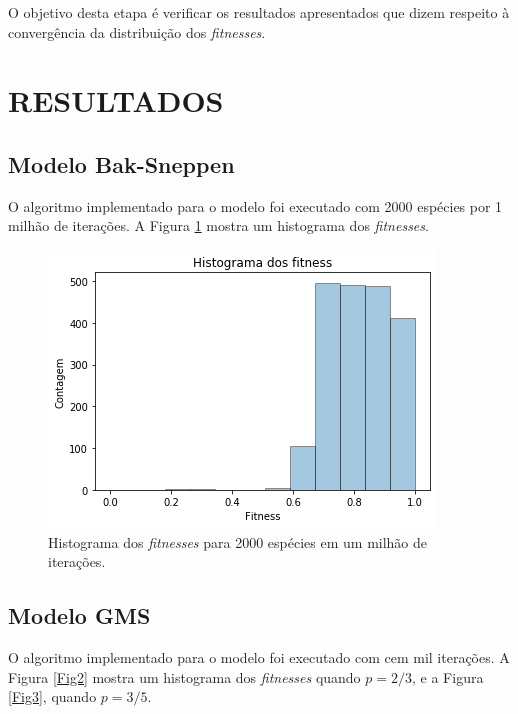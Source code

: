 \documentclass[10pt,brazil,english]{article}
\begin{document}
        O objetivo desta etapa é verificar os resultados apresentados que dizem respeito à convergência da distribuição dos \textit{fitnesses}.

    \section{RESULTADOS}

        \subsection{Modelo Bak-Sneppen}

            O algoritmo implementado para o modelo foi executado com 2000 espécies por 1 milhão de iterações.
            A Figura \ref{Fig1} mostra um histograma dos \textit{fitnesses}.

            \begin{figure}[!hbtp]
                \begin{center}
                    \includegraphics[scale=0.5]{Images/5-1.png}
                \end{center}
                \caption{Histograma dos \textit{fitnesses} para 2000 espécies em um milhão de iterações.}
                \label{Fig1}
            \end{figure}

        \subsection{Modelo GMS}

            O algoritmo implementado para o modelo foi executado com cem mil iterações.
            A Figura \ref{Fig2} mostra um histograma dos \textit{fitnesses} quando $p = 2/3$, e a Figura \ref{Fig3}, quando $p = 3/5$.
\end{document}
